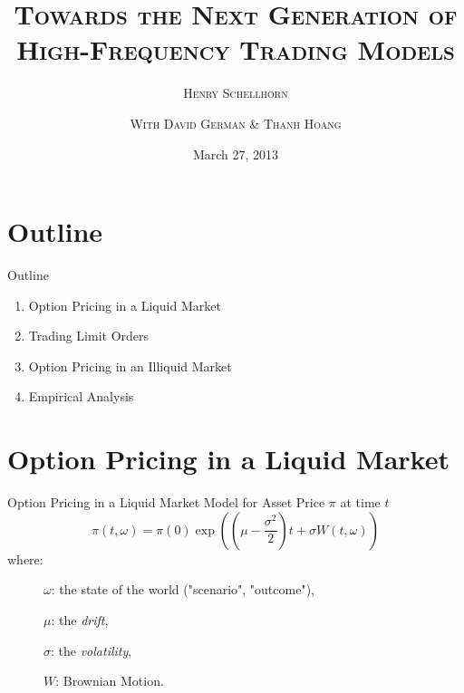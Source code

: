 \documentclass{beamer}
\title[Towards the Next Generation of High-Frequency Trading Models]{{\fontsize{12}{30} \textsc{Towards the Next Generation of High-Frequency Trading Models}}}
\author[Copyright \copyright Henry Schellhorn]{{\fontsize{10}{12}\textsc{Henry Schellhorn}} \qquad \qquad \qquad
	\qquad \qquad \qquad\qquad \qquad \qquad\qquad \qquad \qquad\qquad \qquad \qquad
	\and {\fontsize{8}{10}\textsc{With David German \& Thanh Hoang}}
	}
\institute[CGU]{{\fontsize{9}{10}
	\textsc{Claremont Graduate University}
}}
\date[March 27, 2013]{{\fontsize{8}{8}March 27, 2013}}
\begin{document}
\begin{frame}[plain, shrink=0]
	\titlepage
\end{frame}

\section{Outline}
\begin{frame}[shrink=20]{{\color{cyan}Outline}}
\bigskip

\begin{enumerate}

\item Option Pricing in a Liquid Market

\vspace{8pt}
\item Trading Limit Orders

\vspace{8pt}
\item Option Pricing in an Illiquid Market

\vspace{8pt}
\item Empirical Analysis

\end{enumerate}

\end{frame}

\section{Option Pricing in a Liquid Market}

\begin{frame}[shrink=25]{{\color{cyan}Option Pricing in a Liquid Market}}
\bigskip
Model for Asset Price $\pi $ at time $t$
\begin{equation*}
	\pi (t,\omega )=\pi (0)\exp \left( \left(\mu -\frac{\sigma ^{2}}{2} \right) t+\sigma W(t,\omega) \right)
\end{equation*}
\qquad \qquad where:

\begin{description}
\item[] $\omega$: the state of the world ("scenario", "outcome"),

\item[] $\mu$: the \textit{drift},

\item[] $\sigma$: the \textit{volatility},

\item[] $W$: Brownian Motion.

\end{description}

\end{frame}
\end{document}
